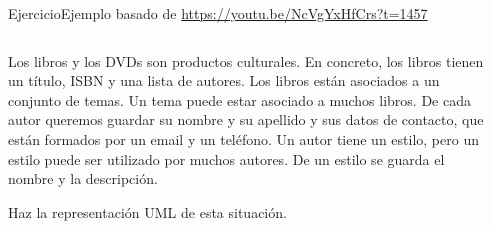 \documentclass[10pt,envcountsect,spanish]{beamer}
\begin{document}
\begin{frame}{Ejercicio}{Ejemplo basado de \url{https://youtu.be/NcVgYxHfCrs?t=1457}}

\begin{columns}
\begin{column}{.4\textwidth}
Los libros y los DVDs son productos culturales.
En concreto, los libros tienen un título, ISBN y una lista de autores.
Los libros están asociados a un conjunto de temas. Un tema puede estar asociado a muchos libros.
De cada autor queremos guardar su nombre y su apellido y sus datos de contacto, que están formados por un email y un teléfono. Un autor tiene un estilo, pero un estilo puede ser utilizado por muchos autores. De un estilo se guarda el nombre y la descripción.

Haz la representación UML de esta situación.
\end{column}
\begin{column}{.4\textwidth}
\end{column}
\end{columns}
\end{frame}
\end{document}
